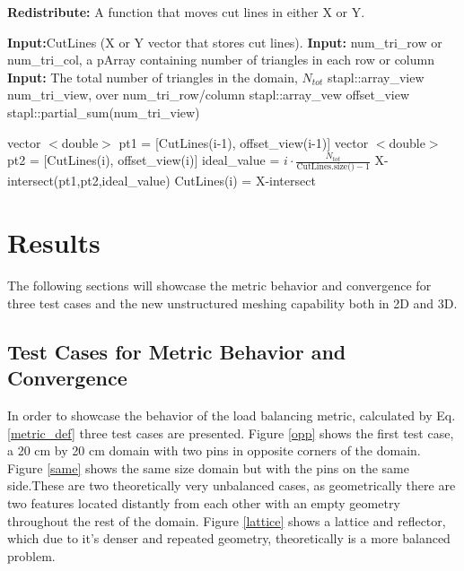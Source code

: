\documentclass{anstrans}
\begin{document}
\begin{algorithm}
\textbf{Redistribute:} A function that moves cut lines in either X or Y. \\
\begin{algorithmic}
\STATE \textbf{Input:}CutLines (X or Y vector that stores cut lines). 
\STATE \textbf{Input:} num\_tri\_row or num\_tri\_col, a pArray containing number of triangles in each row or column 
\STATE \textbf{Input:} The total number of triangles in the domain, $N_{tot}$
\STATE stapl::array\_view num\_tri\_view, over num\_tri\_row/column
\STATE stapl::array\_vew offset\_view
\STATE stapl::partial\_sum(num\_tri\_view) 

	\STATE vector $<$double$>$ pt1 = [CutLines(i-1), offset\_view(i-1)]
	\STATE vector $<$double$>$ pt2 = [CutLines(i), offset\_view(i)]
	\STATE ideal\_value = $i\cdot \frac{N_{tot}}{\text{CutLines.size()}-1}$
	\STATE X-intersect(pt1,pt2,ideal\_value) 
	\STATE CutLines(i) = X-intersect
\ENDFOR
\end{algorithmic}
\end{algorithm}



\section{Results}
\label{ch:results}
The following sections will showcase the metric behavior and convergence for three test cases and the new unstructured meshing capability both in 2D and 3D.

\subsection{Test Cases for Metric Behavior and Convergence}
\label{sec:convergence}
In order to showcase the behavior of the load balancing metric, calculated by Eq. \ref{metric_def} three test cases are presented. Figure \ref{opp} shows the first test case, a 20 cm by 20 cm domain with two pins in opposite corners of the domain. Figure \ref{same} shows the same size domain but with the pins on the same side.These are two theoretically very unbalanced cases, as geometrically there are two features located distantly from each other with an empty geometry throughout the rest of the domain. Figure \ref{lattice} shows a lattice and reflector, which due to it's denser and repeated geometry, theoretically is a more balanced problem. 
\end{document}
